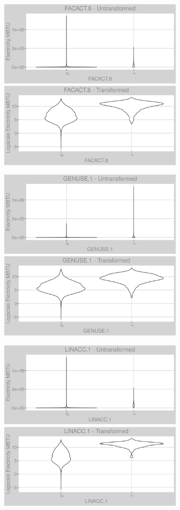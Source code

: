 \newpage
\begin{figure}
\centering
\begin{subfigure}{1\textwidth}
\includegraphics[width=.49\textwidth, height=0.3\textheight]{Images/electricity_var_original_12.png}
\includegraphics[width=.49\textwidth, height=0.3\textheight]{Images/electricity_var_transformed_12.png}
\end{subfigure}
\begin{subfigure}{1\textwidth}
\centering
\includegraphics[width=.49\textwidth, height=0.3\textheight]{Images/electricity_var_original_13.png}
\includegraphics[width=.49\textwidth, height=0.3\textheight]{Images/electricity_var_transformed_13.png}
\end{subfigure}
\begin{subfigure}{1\textwidth}
\centering
\includegraphics[width=.49\textwidth, height=0.3\textheight]{Images/electricity_var_original_14.png}
\includegraphics[width=.49\textwidth, height=0.3\textheight]{Images/electricity_var_transformed_14.png}
\end{subfigure}
\end{figure}
